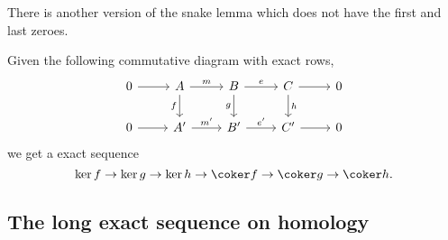 \documentclass[main.tex]{subfiles}
\begin{document}
There is another version of the snake lemma which does not have the first and last zeroes.
\begin{theorem}
  \label{thm:snake_lemma_ii}
  Given the following commutative diagram with exact rows,
  \begin{equation*}
    \begin{tikzcd}
      0
      \arrow[r]
      & A
      \arrow[d, swap, "f"]
      \arrow[r, "m"]
      & B
      \arrow[r, "e"]
      \arrow[d, swap, "g"]
      & C
      \arrow[r]
      \arrow[d, "h"]
      & 0
      \\
      0
      \arrow[r]
      & A'
      \arrow[r, "m'"]
      & B'
      \arrow[r, "e'"]
      & C'
      \arrow[r]
      & 0
    \end{tikzcd}
  \end{equation*}
  we get a exact sequence
  \begin{equation*}
    \ker f \to \ker g \to \ker h \to \coker f \to \coker g \to \coker h.
  \end{equation*}
\end{theorem}

\subsection{The long exact sequence on homology}
\label{ssc:the_long_exact_sequence_on_homology}
\end{document}
